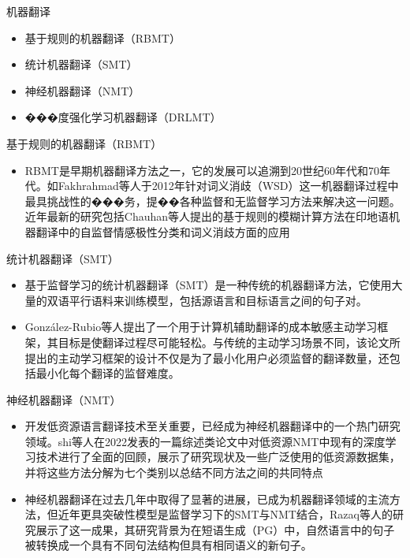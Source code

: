 \documentclass[UTF8,AutoFakeBold,AutoFakeSlant]{beamer}
\begin{document}
\begin{frame}{机器翻译}
    \begin{itemize}
        \item 基于规则的机器翻译（RBMT）
        \item 统计机器翻译（SMT）
        \item 神经机器翻译（NMT）
        \item ���度强化学习机器翻译（DRLMT）
    \end{itemize}
\end{frame}

\begin{frame}{基于规则的机器翻译（RBMT）}
    \begin{itemize}
        \item RBMT是早期机器翻译方法之一，它的发展可以追溯到20世纪60年代和70年代。如Fakhrahmad等人于2012年针对词义消歧（WSD）这一机器翻译过程中最具挑战性的���务，提��各种监督和无监督学习方法来解决这一问题。近年最新的研究包括Chauhan等人提出的基于规则的模糊计算方法在印地语机器翻译中的自监督情感极性分类和词义消歧方面的应用
    \end{itemize}
\end{frame}

\begin{frame}{统计机器翻译（SMT）}
    \begin{itemize}
        \item 基于监督学习的统计机器翻译（SMT）是一种传统的机器翻译方法，它使用大量的双语平行语料来训练模型，包括源语言和目标语言之间的句子对。
        \item González-Rubio等人提出了一个用于计算机辅助翻译的成本敏感主动学习框架，其目标是使翻译过程尽可能轻松。与传统的主动学习场景不同，该论文所提出的主动学习框架的设计不仅是为了最小化用户必须监督的翻译数量，还包括最小化每个翻译的监督难度。
    \end{itemize}
\end{frame}

\begin{frame}{神经机器翻译（NMT）}
    \scriptsize
    \begin{itemize}
        \item 开发低资源语言翻译技术至关重要，已经成为神经机器翻译中的一个热门研究领域。shi等人在2022发表的一篇综述类论文中对低资源NMT中现有的深度学习技术进行了全面的回顾，展示了研究现状及一些广泛使用的低资源数据集，并将这些方法分解为七个类别以总结不同方法之间的共同特点
        \item 神经机器翻译在过去几年中取得了显著的进展，已成为机器翻译领域的主流方法，但近年更具突破性模型是监督学习下的SMT与NMT结合，Razaq等人的研究展示了这一成果，其研究背景为在短语生成（PG）中，自然语言中的句子被转换成一个具有不同句法结构但具有相同语义的新句子。
    \end{itemize}
\end{frame}
\end{document}
